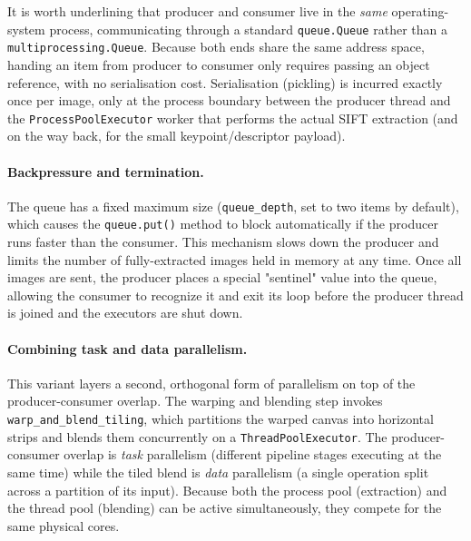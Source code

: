 \documentclass[10pt,twocolumn,letterpaper]{article}
\begin{document}
It is worth underlining that producer and consumer live in the \emph{same}
operating-system process, communicating through a standard
\texttt{queue.Queue} rather than a \texttt{multiprocessing.Queue}. Because
both ends share the same address space, handing an item from producer to
consumer only requires passing an object reference, with no serialisation
cost. Serialisation (pickling) is incurred exactly once per image, only at
the process boundary between the producer thread and the
\texttt{ProcessPoolExecutor} worker that performs the actual SIFT
extraction (and on the way back, for the small keypoint/descriptor
payload).

\paragraph{Backpressure and termination.} The queue has a fixed maximum 
size (\texttt{queue\_depth}, set to two items by default), which causes 
the \texttt{queue.put()} method to block automatically if the producer 
runs faster than the consumer. This mechanism slows down the producer 
and limits the number of fully-extracted images held in memory at any 
time. Once all images are sent, the producer places a special "sentinel" 
value into the queue, allowing the consumer to recognize it and exit 
its loop before the producer thread is joined and the executors are shut 
down.

\paragraph{Combining task and data parallelism.}
This variant layers a second, orthogonal form of parallelism on top of the
producer-consumer overlap. The warping and blending step invokes
\texttt{warp\_and\_blend\_tiling}, which partitions the warped canvas into
horizontal strips and blends them concurrently on a
\texttt{ThreadPoolExecutor}. The producer-consumer overlap is
\emph{task} parallelism  (different pipeline stages executing at the
same time) while the tiled blend is \emph{data} parallelism (a
single operation split across a partition of its input). Because both the
process pool (extraction) and the thread pool (blending) can be active
simultaneously, they compete for the same physical cores.
\end{document}
